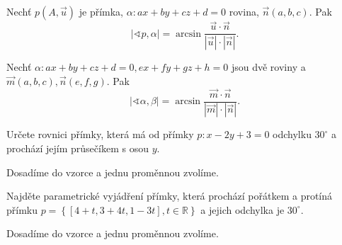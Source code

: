 \begin{veta}
    Nechť $p(A,\vec u)$ je přímka, $\alpha:ax+by+cz+d=0$ rovina, $\vec n(a,b,c)$. Pak
    $$|\sphericalangle p, \alpha|=\arcsin \frac{\vec u \cdot \vec n}{|\vec u|\cdot |\vec n|}.$$
\end{veta}

\begin{veta}
    Nechť $\alpha:ax+by+cz+d=0, ex+fy+gz+h=0$ jsou dvě roviny a $\vec m(a,b,c), \vec n(e,f,g).$
    Pak
    $$|\sphericalangle \alpha, \beta|=\arcsin \frac{\vec m \cdot \vec n}{|\vec m|\cdot |\vec n|}.$$
\end{veta}

\begin{priklad}
Určete rovnici přímky, která má od přímky $p:x-2y+3=0$ odchylku $30^\circ$ a prochází
jejím průsečíkem s osou $y$.
\end{priklad}

\begin{reseni}
Dosadíme do vzorce a jednu proměnnou zvolíme.
\end{reseni}

\begin{priklad}
Najděte parametrické vyjádření přímky, která prochází pořátkem a protíná přímku $p=\left \{ [4+t,3+4t,1-3t],t\in \mathbb R \right \} $
a jejich odchylka je $30^\circ$.
\end{priklad}

\begin{reseni}
Dosadíme do vzorce a jednu proměnnou zvolíme.
\end{reseni}
